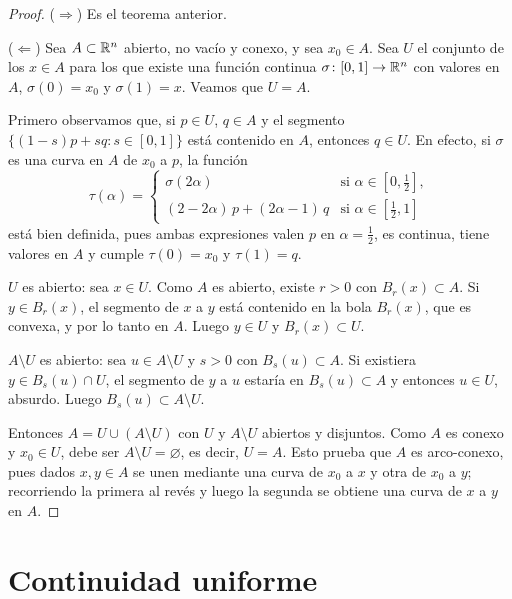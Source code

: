 \begin{proof}
  (\(\Rightarrow\)) Es el teorema anterior.

  (\(\Leftarrow\)) Sea \(A \subset \mathbb{R}^n\) abierto, no vacío y conexo, y sea \(x_0 \in A\). Sea \(U\) el conjunto de los \(x \in A\) para los que existe una función continua \(\sigma\colon [0, 1] \to \mathbb{R}^n\) con valores en \(A\), \(\sigma(0) = x_0\) y \(\sigma(1) = x\). Veamos que \(U = A\).

  Primero observamos que, si \(p \in U\), \(q \in A\) y el segmento \(\{ (1-s)p + sq : s \in [0, 1] \}\) está contenido en \(A\), entonces \(q \in U\). En efecto, si \(\sigma\) es una curva en \(A\) de \(x_0\) a \(p\), la función
  \[
    \tau(\alpha) = \begin{cases}
      \sigma(2\alpha)                       & \text{si } \alpha \in \left[ 0, \tfrac{1}{2} \right], \\
      (2 - 2\alpha)\, p + (2\alpha - 1)\, q & \text{si } \alpha \in \left[ \tfrac{1}{2}, 1 \right]
    \end{cases}
  \]
  está bien definida, pues ambas expresiones valen \(p\) en \(\alpha = \frac{1}{2}\), es continua, tiene valores en \(A\) y cumple \(\tau(0) = x_0\) y \(\tau(1) = q\).

  \(U\) es abierto: sea \(x \in U\). Como \(A\) es abierto, existe \(r > 0\) con \(B_r(x) \subset A\). Si \(y \in B_r(x)\), el segmento de \(x\) a \(y\) está contenido en la bola \(B_r(x)\), que es convexa, y por lo tanto en \(A\). Luego \(y \in U\) y \(B_r(x) \subset U\).

  \(A \setminus U\) es abierto: sea \(u \in A \setminus U\) y \(s > 0\) con \(B_s(u) \subset A\). Si existiera \(y \in B_s(u) \cap U\), el segmento de \(y\) a \(u\) estaría en \(B_s(u) \subset A\) y entonces \(u \in U\), absurdo. Luego \(B_s(u) \subset A \setminus U\).

  Entonces \(A = U \cup (A \setminus U)\) con \(U\) y \(A \setminus U\) abiertos y disjuntos. Como \(A\) es conexo y \(x_0 \in U\), debe ser \(A \setminus U = \varnothing\), es decir, \(U = A\). Esto prueba que \(A\) es arco-conexo, pues dados \(x, y \in A\) se unen mediante una curva de \(x_0\) a \(x\) y otra de \(x_0\) a \(y\); recorriendo la primera al revés y luego la segunda se obtiene una curva de \(x\) a \(y\) en \(A\).
\end{proof}

\section{Continuidad uniforme}

